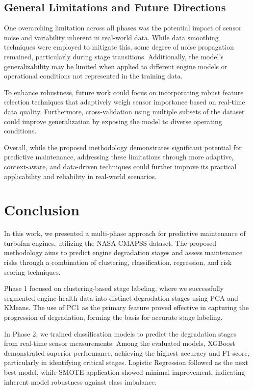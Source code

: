 \documentclass[conference]{IEEEtran}
\begin{document}
\subsection{General Limitations and Future Directions}

One overarching limitation across all phases was the potential impact of sensor noise and variability inherent in real-world data. While data smoothing techniques were employed to mitigate this, some degree of noise propagation remained, particularly during stage transitions. Additionally, the model’s generalizability may be limited when applied to different engine models or operational conditions not represented in the training data.

To enhance robustness, future work could focus on incorporating robust feature selection techniques that adaptively weigh sensor importance based on real-time data quality. Furthermore, cross-validation using multiple subsets of the dataset could improve generalization by exposing the model to diverse operating conditions.

Overall, while the proposed methodology demonstrates significant potential for predictive maintenance, addressing these limitations through more adaptive, context-aware, and data-driven techniques could further improve its practical applicability and reliability in real-world scenarios.




\section{Conclusion}

In this work, we presented a multi-phase approach for predictive maintenance of turbofan engines, utilizing the NASA CMAPSS dataset. The proposed methodology aims to predict engine degradation stages and assess maintenance risks through a combination of clustering, classification, regression, and risk scoring techniques.

Phase 1 focused on clustering-based stage labeling, where we successfully segmented engine health data into distinct degradation stages using PCA and KMeans. The use of PC1 as the primary feature proved effective in capturing the progression of degradation, forming the basis for accurate stage labeling.

In Phase 2, we trained classification models to predict the degradation stages from real-time sensor measurements. Among the evaluated models, XGBoost demonstrated superior performance, achieving the highest accuracy and F1-score, particularly in identifying critical stages. Logistic Regression followed as the next best model, while SMOTE application showed minimal improvement, indicating inherent model robustness against class imbalance.
\end{document}

